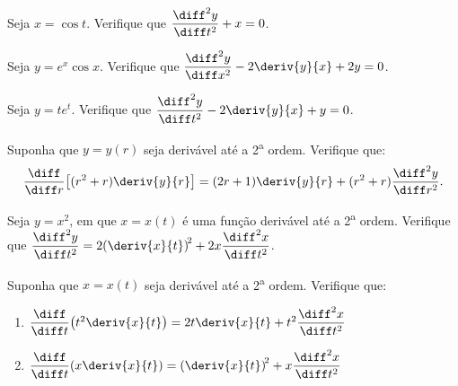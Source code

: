 \begin{exercicio}[11]
\label{ex:7.9.11}
Seja $x = \cos t$. Verifique que $\dfrac{\diff^2 y}{\diff t^2} + x = 0$.
\end{exercicio}

\begin{exercicio}[12]
\label{ex:7.9.12}
Seja $y = e^x \cos x$. Verifique que $\dfrac{\diff^2 y}{\diff x^2} - 2\deriv{y}{x} + 2y = 0$.
\end{exercicio}

\begin{exercicio}[13]
\label{ex:7.9.13}
Seja $y = te^t$. Verifique que $\dfrac{\diff^2 y}{\diff t^2} - 2\deriv{y}{x} + y = 0$.
\end{exercicio}

\begin{exercicio}[14]
\label{ex:7.9.14}
Suponha que $y = y(r)$ seja derivável até a 2\textsuperscript{a} ordem. Verifique que:
\[
\frac{\diff}{\diff r}\!\left[(r^2 + r)\deriv{y}{r}\right] = (2r + 1)\deriv{y}{r} + (r^2 + r)\frac{\diff^2 y}{\diff r^2}.
\]
\end{exercicio}

\begin{exercicio}[15]
\label{ex:7.9.15}
Seja $y = x^2$, em que $x = x(t)$ é uma função derivável até a 2\textsuperscript{a} ordem. Verifique que $\dfrac{\diff^2 y}{\diff t^2} = 2\!\left(\deriv{x}{t}\right)^{\!2} + 2x\dfrac{\diff^2 x}{\diff t^2}$.
\end{exercicio}

\begin{exercicio}[16]
\label{ex:7.9.16}
Suponha que $x = x(t)$ seja derivável até a 2\textsuperscript{a} ordem. Verifique que:
\begin{enumerate}[label=\alph*)]
    \item $\dfrac{\diff}{\diff t}\!\left(t^2 \deriv{x}{t}\right) = 2t\deriv{x}{t} + t^2 \dfrac{\diff^2 x}{\diff t^2}$
    \item $\dfrac{\diff}{\diff t}\!\left(x \deriv{x}{t}\right) = \left(\deriv{x}{t}\right)^{\!2} + x\dfrac{\diff^2 x}{\diff t^2}$
\end{enumerate}
\end{exercicio}

\clearpage

